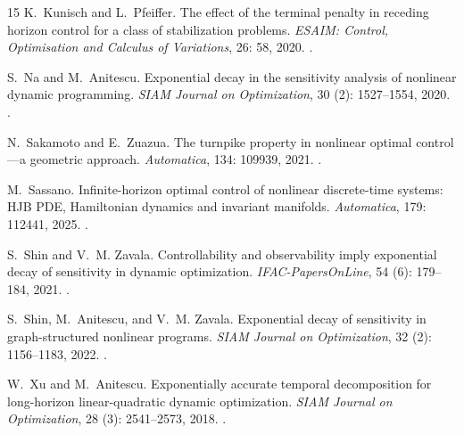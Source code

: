 \documentclass[twocolumn,nameyear,amsthm]{autart}
\numberwithin{equation}{section}
\begin{document}
\begin{thebibliography}{15}
K.~Kunisch and L.~Pfeiffer.
\newblock The effect of the terminal penalty in receding horizon control for a
  class of stabilization problems.
\newblock \emph{ESAIM: Control, Optimisation and Calculus of Variations},
  26: 58, 2020.
\newblock {}.

S.~Na and M.~Anitescu.
\newblock Exponential decay in the sensitivity analysis of nonlinear dynamic
  programming.
\newblock \emph{SIAM Journal on Optimization}, 30 (2):
  1527--1554, 2020.
\newblock {}.

N.~Sakamoto and E.~Zuazua.
\newblock The turnpike property in nonlinear optimal control---a geometric
  approach.
\newblock \emph{Automatica}, 134: 109939, 2021.
\newblock {}.

M.~Sassano.
\newblock Infinite-horizon optimal control of nonlinear discrete-time systems:
  {HJB} {PDE}, Hamiltonian dynamics and invariant manifolds.
\newblock \emph{Automatica}, 179: 112441, 2025.
\newblock {}.

S.~Shin and V.~M. Zavala.
\newblock Controllability and observability imply exponential decay of
  sensitivity in dynamic optimization.
\newblock \emph{IFAC-PapersOnLine}, 54 (6): 179--184, 2021.
\newblock {}.

S.~Shin, M.~Anitescu, and V.~M. Zavala.
\newblock Exponential decay of sensitivity in graph-structured nonlinear
  programs.
\newblock \emph{SIAM Journal on Optimization}, 32 (2):
  1156--1183, 2022.
\newblock {}.

W.~Xu and M.~Anitescu.
\newblock Exponentially accurate temporal decomposition for long-horizon
  linear-quadratic dynamic optimization.
\newblock \emph{SIAM Journal on Optimization}, 28 (3):
  2541--2573, 2018.
\newblock {}.

\end{thebibliography}
\endgroup
\end{document}
